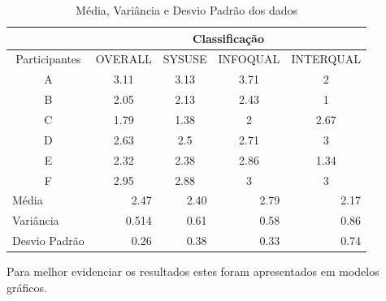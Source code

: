 \begin{table}[h]
\begin{tabular}{|c|c|c|c|c|}
\hline
\multicolumn{1}{|l|}{}              & \multicolumn{4}{c|}{Classificação}                                                                             \\ \hline
Participantes                       & OVERALL                    & SYSUSE                    & INFOQUAL                  & INTERQUAL                 \\ \hline
A                                   & 3.11                       & 3.13                      & 3.71                      & 2                         \\ \hline
B                                   & 2.05                       & 2.13                      & 2.43                      & 1                         \\ \hline
C                                   & 1.79                       & 1.38                      & 2                         & 2.67                      \\ \hline
D                                   & 2.63                       & 2.5                       & 2.71                      & 3                         \\ \hline
E                                   & 2.32                       & 2.38                      & 2.86                      & 1.34                      \\ \hline
F                                   & 2.95                       & 2.88                      & 3                         & 3                         \\ \hline
\multicolumn{1}{|l|}{Média}         & \multicolumn{1}{r|}{2.47}  & \multicolumn{1}{r|}{2.40} & \multicolumn{1}{r|}{2.79} & \multicolumn{1}{r|}{2.17} \\ \hline
\multicolumn{1}{|l|}{Variância}     & \multicolumn{1}{r|}{0.514} & \multicolumn{1}{r|}{0.61} & \multicolumn{1}{r|}{0.58} & \multicolumn{1}{r|}{0.86} \\ \hline
\multicolumn{1}{|l|}{Desvio Padrão} & \multicolumn{1}{r|}{0.26}  & \multicolumn{1}{r|}{0.38} & \multicolumn{1}{r|}{0.33} & \multicolumn{1}{r|}{0.74} \\ \hline
\end{tabular}
\caption{Média, Variância e Desvio Padrão dos dados}
\end{table}

Para melhor evidenciar os resultados estes foram apresentados em modelos gráficos.

